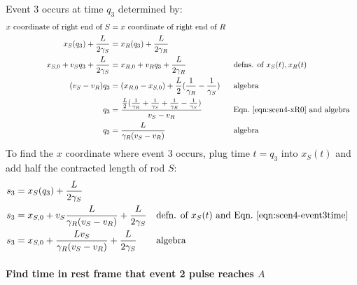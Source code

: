 \documentclass[a4paper]{article}
\theoremstyle{plain}
\theoremstyle{definition}
\begin{document}
Event 3 occurs at time $q_3$ determined by:
\begin{align}
\text{$x$ coordinate of right end of $S$} & = \text{$x$ coordinate of right end of $R$} \nonumber \\
x_S(q_3) + \frac{L}{2\gamma_S} & = x_R(q_3) + \frac{L}{2\gamma_R} \nonumber \\
x_{S,0} + v_S q_3 + \frac{L}{2\gamma_S} & = x_{R,0} + v_R q_3 + \frac{L}{2\gamma_R} & & \text{defns. of $x_S(t), x_R(t)$} \nonumber \\
(v_S - v_R) q_3 & = (x_{R,0} - x_{S,0}) + \frac{L}{2} ( \frac{1}{\gamma_R} - \frac{1}{\gamma_S} ) & & \text{algebra} \nonumber \\
q_3 & = \frac{ \frac{L}{2} ( \frac{1}{\gamma_R} + \frac{1}{\gamma_S} + \frac{1}{\gamma_R} - \frac{1}{\gamma_S})}{v_S - v_R} & & \text{Eqn.~\eqref{eqn:scen4-xR0} and algebra} \nonumber \\
q_3 & = \frac{L}{\gamma_R(v_S - v_R)} & & \text{algebra} \label{eqn:scen4-event3time}
\end{align}
To find the $x$ coordinate where event 3 occurs, plug time $t=q_3$
into $x_S(t)$ and add half the contracted length of rod $S$:
\begin{align}
s_3 & = x_S(q_3) + \frac{L}{2\gamma_S} \nonumber \\
s_3 & = x_{S,0} + v_S \frac{L}{\gamma_R(v_S - v_R)} + \frac{L}{2\gamma_S} & & \text{defn. of $x_S(t)$ and Eqn.~\eqref{eqn:scen4-event3time}} \nonumber \\
s_3 & = x_{S,0} + \frac{Lv_S}{\gamma_R(v_S - v_R)} + \frac{L}{2\gamma_S} & & \text{algebra} \label{eqn:scen4-event3xcoord}
\end{align}


\paragraph{Find time in rest frame that event 2 pulse reaches $A$}
\end{document}
